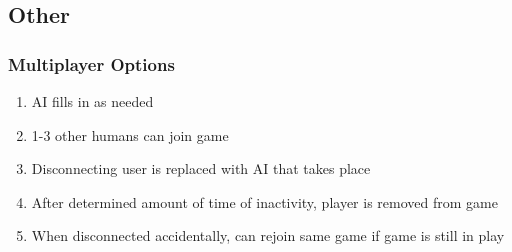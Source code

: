 \documentclass[11pt, titlepage]{article}
\begin{document}
	      	\subsection{Other}
	      	\subsubsection{Multiplayer Options}
	      	\begin{enumerate}
	      		\item AI fills in as needed
	      		\item 1-3 other humans can join game
	      		\item Disconnecting user is replaced with AI that takes place
	      		\item After determined amount of time of inactivity, player is removed from game
	      		\item When disconnected accidentally, can rejoin same game if game is still in play
	      	\end{enumerate}
\end{document}
